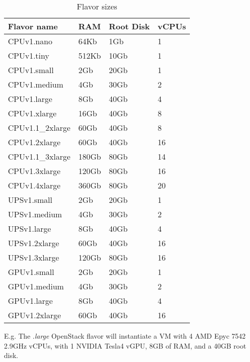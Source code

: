 \begin{table}[h!]
\centering
\begin{tabular}{ |p{3cm}|p{3cm}|p{3cm}|p{3cm}| }
  \hline
  \rowcolor{lightgray} \textbf{Flavor name} & \textbf{RAM} & \textbf{Root Disk} & \textbf{vCPUs} \\
  \hline
  CPUv1.nano & 64Kb & 1Gb & 1 \\
  \hline
  CPUv1.tiny & 512Kb & 10Gb & 1 \\
  \hline
  CPUv1.small & 2Gb & 20Gb & 1 \\
  \hline
  CPUv1.medium & 4Gb & 30Gb & 2 \\
  \hline
  CPUv1.large & 8Gb & 40Gb & 4 \\
  \hline
  CPUv1.xlarge & 16Gb & 40Gb & 8 \\
  \hline
  CPUv1.1\_2xlarge & 60Gb & 40Gb & 8 \\
  \hline
  CPUv1.2xlarge & 60Gb & 40Gb & 16 \\  
  \hline
  CPUv1.1\_3xlarge & 180Gb & 80Gb & 14 \\
  \hline
  CPUv1.3xlarge & 120Gb & 80Gb & 16 \\
  \hline
  CPUv1.4xlarge & 360Gb & 80Gb & 20 \\
  \hline
  UPSv1.small & 2Gb & 20Gb & 1 \\
  \hline
  UPSv1.medium & 4Gb & 30Gb & 2 \\
  \hline
  UPSv1.large & 8Gb & 40Gb & 4 \\
  \hline
  UPSv1.2xlarge & 60Gb & 40Gb & 16 \\
  \hline
  UPSv1.3xlarge & 120Gb & 80Gb & 16 \\
  \hline
  GPUv1.small & 2Gb & 20Gb & 1 \\
  \hline
  GPUv1.medium & 4Gb & 30Gb & 2 \\
  \hline
  GPUv1.large & 8Gb & 40Gb & 4 \\
  \hline
  GPUv1.2xlarge & 60Gb & 40Gb & 16 \\
  \hline
\end{tabular}
\caption{Flavor sizes}
\label{table:flavor-size}
\end{table}


E.g. The .\emph{large} OpenStack flavor will instantiate a
VM with 4 AMD Epyc 7542 2.9GHz vCPUs, with 1 NVIDIA Tesla4 vGPU, 8GB
of RAM, and a 40GB root disk.


